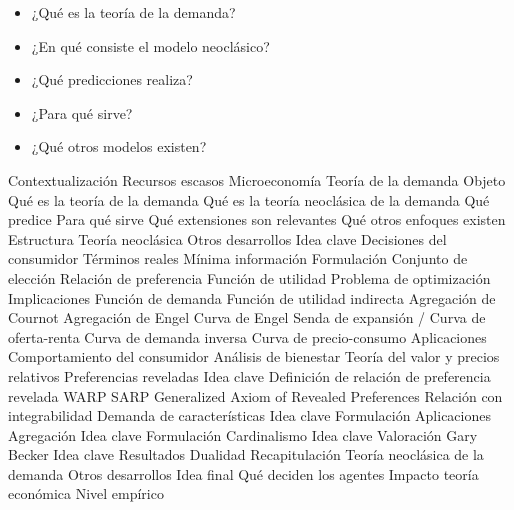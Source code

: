 \documentclass{nuevotema}
\begin{document}
\begin{itemize}
	\item ¿Qué es la teoría de la demanda?
	\item ¿En qué consiste el modelo neoclásico?
	\item ¿Qué predicciones realiza?
	\item ¿Para qué sirve?
	\item ¿Qué otros modelos existen?
\end{itemize}

\esquemacorto

\begin{esquema}[enumerate]
	\1[] 
		\2 Contextualización
			\3 Recursos escasos
			\3 Microeconomía
			\3 Teoría de la demanda
		\2 Objeto
			\3 Qué es la teoría de la demanda
			\3 Qué es la teoría neoclásica de la demanda
			\3 Qué predice
			\3 Para qué sirve
			\3 Qué extensiones son relevantes
			\3 Qué otros enfoques existen
		\2 Estructura
			\3 Teoría neoclásica
			\3 Otros desarrollos
	\1 
		\2 Idea clave
			\3 Decisiones del consumidor
			\3 Términos reales
			\3 Mínima información
		\2 Formulación
			\3 Conjunto de elección
			\3 Relación de preferencia
			\3 Función de utilidad
			\3 Problema de optimización
		\2 Implicaciones
			\3 Función de demanda
			\3 Función de utilidad indirecta
			\3 Agregación de Cournot
			\3 Agregación de Engel
			\3 Curva de Engel
			\3 Senda de expansión / Curva de oferta-renta
			\3 Curva de demanda inversa
			\3 Curva de precio-consumo
		\2 Aplicaciones
			\3 Comportamiento del consumidor
			\3 Análisis de bienestar
			\3 Teoría del valor y precios relativos
	\1 
		\2 Preferencias reveladas
			\3 Idea clave
			\3 Definición de relación de preferencia revelada
			\3 WARP
			\3 SARP
			\3 Generalized Axiom of Revealed Preferences
			\3 Relación con integrabilidad
		\2 Demanda de características
			\3 Idea clave
			\3 Formulación
			\3 Aplicaciones
		\2 Agregación
			\3 Idea clave
			\3 Formulación
		\2 Cardinalismo
			\3 Idea clave
			\3 Valoración
		\2 Gary Becker
			\3 Idea clave
			\3 Resultados
		\2 Dualidad
	\1[] 
		\2 Recapitulación
			\3 Teoría neoclásica de la demanda
			\3  Otros desarrollos
		\2 Idea final
			\3 Qué deciden los agentes
			\3 Impacto teoría económica
			\3 Nivel empírico

\end{esquema}

\esquemalargo
\end{document}
